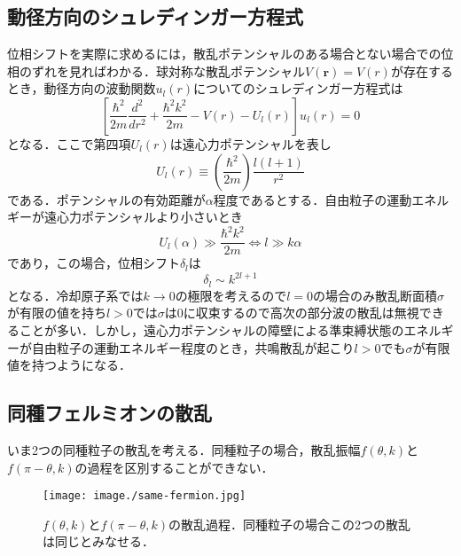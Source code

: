 \documentclass[11pt,a4j,notitlepage]{jreport}
\begin{document}
\subsection{動径方向のシュレディンガー方程式}
位相シフトを実際に求めるには，散乱ポテンシャルのある場合とない場合での位相のずれを見ればわかる．球対称な散乱ポテンシャル$V(\boldsymbol{r})=V(r)$が存在するとき，動径方向の波動関数$u_{l}(r)$についてのシュレディンガー方程式は
\begin{equation}
	\left[ \frac{\hbar^{2}}{2 m} \frac{d^{2}}{d r^{2}} + \frac{\hbar^{2} k^2}{2 m}-V(r)-U_{l}(r) \right] u_{l}(r)=0
	\label{eq2.2.9}
\end{equation}
となる．ここで第四項$U_{l}(r)$は遠心力ポテンシャルを表し
\begin{equation}
	U_{l}(r) \equiv \left(\frac{\hbar^{2}}{2 m}\right) \frac{l(l+1)}{r^{2}}
	\label{eq2.2.10}
\end{equation}
である．ポテンシャルの有効距離が$\alpha$程度であるとする．自由粒子の運動エネルギーが遠心力ポテンシャルより小さいとき
\begin{equation}
	U_{l}(\alpha) \gg \frac{\hbar^{2} k^2}{2 m} \Leftrightarrow l \gg k \alpha
	\label{eq2.2.11}
\end{equation}
であり，この場合，位相シフト$\delta_{l}$は
\begin{equation}
	\delta_{l} \sim k^{2 l+1}
	\label{eq2.2.12}
\end{equation}
となる．冷却原子系では$k \rightarrow 0$の極限を考えるので$l=0$の場合のみ散乱断面積$\sigma$が有限の値を持ち$l > 0$では$\sigma$は$0$に収束するので高次の部分波の散乱は無視できることが多い．しかし，遠心力ポテンシャルの障壁による準束縛状態のエネルギーが自由粒子の運動エネルギー程度のとき，共鳴散乱が起こり$l > 0$でも$\sigma$が有限値を持つようになる．

\subsection{同種フェルミオンの散乱}
いま2つの同種粒子の散乱を考える．同種粒子の場合，散乱振幅$f(\theta, k)$と$f(\pi - \theta, k)$の過程を区別することができない．
\begin{figure}[h]
	\centering
		\texttt{[image: image./same-fermion.jpg]}
	\caption{$f(\theta, k)$と$f(\pi - \theta, k)$の散乱過程．同種粒子の場合この2つの散乱は同じとみなせる．}
	\label{fig2.2.1}
\end{figure}
\end{document}
